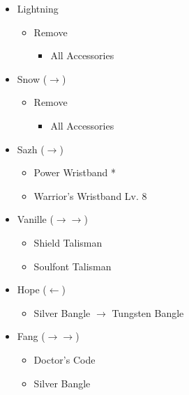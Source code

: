 \begin{multicols}{2}
  \begin{menu}
    \begin{itemize}
      \equip
      \begin{itemize}
        \item Lightning
              \begin{itemize}
                \item Remove
                      \begin{itemize}
                        \item All Accessories
                      \end{itemize}
              \end{itemize}
        \item Snow ($\rightarrow$)
              \begin{itemize}
                \item Remove
                      \begin{itemize}
                        \item All Accessories
                      \end{itemize}
              \end{itemize}
        \item Sazh ($\rightarrow$)
              \begin{itemize}
                \item Power Wristband *
                \item Warrior's Wristband Lv. 8
              \end{itemize}
        \item Vanille ($\rightarrow\rightarrow$)
              \begin{itemize}
                \item Shield Talisman
                \item Soulfont Talisman
              \end{itemize}
        \item Hope ($\leftarrow$)
              \begin{itemize}
                \item Silver Bangle $\rightarrow$ Tungsten Bangle
              \end{itemize}
        \item Fang ($\rightarrow\rightarrow$)
              \begin{itemize}
                \item Doctor's Code
                \item Silver Bangle

\end{itemize}
\end{itemize}
\end{itemize}
\end{menu}
\end{multicols}
